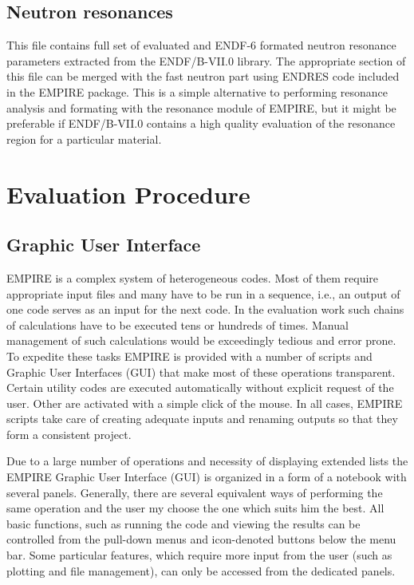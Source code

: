 \documentclass[twocolumn,amsmath,amssymb,10pt,groupedaddress,a4paper]{revtex4}
\begin{document}
\subsection{Neutron resonances}
This file contains full set of evaluated and ENDF-6 formated
neutron resonance parameters extracted from the ENDF/B-VII.0 library.
The appropriate section of this file can be merged with the fast
neutron part using ENDRES code included in the EMPIRE package. This is a
simple alternative to performing resonance analysis and formating with the
resonance module of EMPIRE, but it might be preferable if ENDF/B-VII.0
contains a high quality evaluation of the resonance region for a particular
material.

\section{Evaluation Procedure}

\subsection{Graphic User Interface}
EMPIRE is a complex system of heterogeneous codes. Most of them require
appropriate input files and many have to be run in a sequence, i.e., an output of one code serves
as an input for the next code. In the evaluation work such chains of
calculations have to be executed tens or hundreds of times. Manual  management of such calculations
would be exceedingly tedious and error prone. To expedite these tasks EMPIRE is provided with a number of scripts and Graphic User Interfaces (GUI) that make most of these operations transparent.
Certain utility codes are executed automatically without explicit request of the user.
Other are activated with a simple click of the mouse. In all cases, EMPIRE scripts take
care of creating adequate inputs and renaming outputs so that they form a consistent project.

Due to a large number of operations and necessity of displaying extended lists the EMPIRE Graphic User Interface (GUI)
is organized in a form of a notebook with several panels. Generally,
there are several equivalent ways of performing the same operation
and the user my choose the one which suits him the best. All basic functions,
such as running the code and viewing the results can be controlled from
the pull-down menus and icon-denoted buttons below the menu bar.
Some particular features, which require more input from the user (such as plotting and file management), can only be accessed from the dedicated panels.
\end{document}
